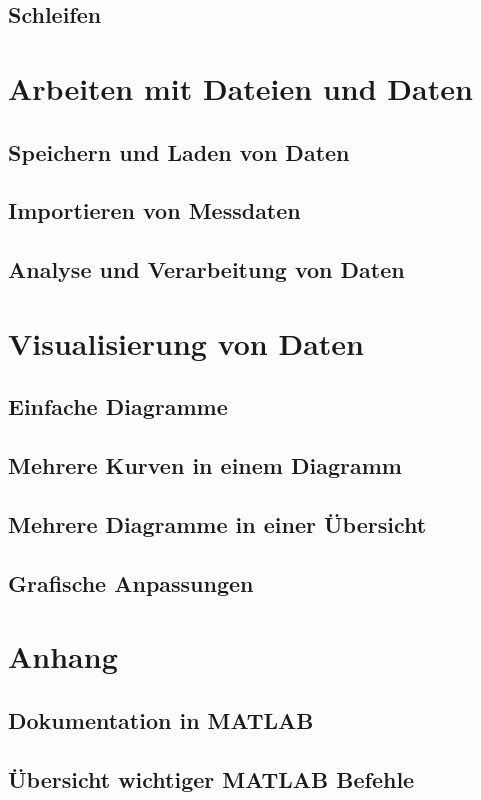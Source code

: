 \documentclass[12pt, a4paper, twoside]{article}
\begin{document}
        \subsection{Schleifen}
    \section{Arbeiten mit Dateien und Daten}
        \subsection{Speichern und Laden von Daten}
        \subsection{Importieren von Messdaten}
        \subsection{Analyse und Verarbeitung von Daten}
    \section{Visualisierung von Daten}
        \subsection{Einfache Diagramme}
        \subsection{Mehrere Kurven in einem Diagramm}
        \subsection{Mehrere Diagramme in einer Übersicht}
        \subsection{Grafische Anpassungen}
    \section{Anhang}
        \subsection{Dokumentation in MATLAB}
        \subsection{Übersicht wichtiger MATLAB Befehle}
\end{document}
